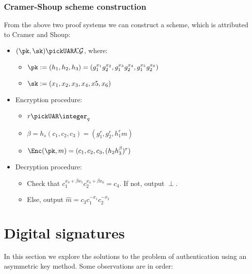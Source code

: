 
\subsubsection{Cramer-Shoup scheme construction}

From the above two proof systems we can construct a \pke{} scheme, which is attributed to Cramer and Shoup:


\begin{itemize}
    \item $(\pk, \sk) \pickUAR \keygen$, where:
    \begin{itemize}
        \item $\pk := (h_1, h_2, h_3) = (g_1^{x_1} g_2^{x_2}, g_1^{x_3} g_2^{x_4}, g_1^{x_5} g_2^{x_6})$
        \item $\sk := (x_1, x_2, x_3, x_4, x5, x_6)$
    \end{itemize}
    \item Encryption procedure:
    \begin{itemize}
        \item $r \pickUAR \integer_q$
        \item $\beta = h_s(c_1, c_2, c_3) = (g_1^r, g_2^r, h_1^r m)$
        \item $\Enc(\pk, m) = (c_1, c_2, c_3, (h_2 h_3^\beta)^r)$
    \end{itemize}
    \item Decryption procedure:
    \begin{itemize}
        \item Check that $c_1^{x_3 + \beta x_5} c_2^{x_4 + \beta x_6} = c_4$. If not, output $\perp$.
        \item Else, output $\widehat{m} = c_3 c_1^{-x_1} c_2^{-x_2}$
    \end{itemize}
\end{itemize}


\section{Digital signatures}

In this section we explore the solutions to the problem of authentication using an asymmetric key method. Some observations are in order:

